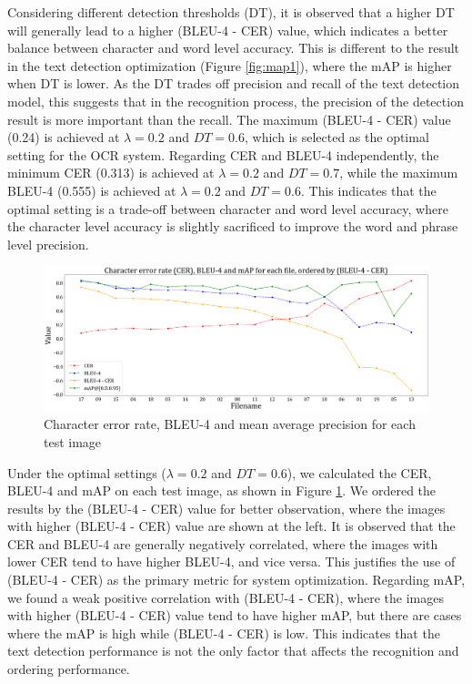 \documentclass[12pt,twoside]{report}
\begin{document}
Considering different detection thresholds (DT), it is observed that a higher DT will generally lead to a higher (BLEU-4 - CER) value, which indicates a better balance between character and word level accuracy. This is different to the result in the text detection optimization (Figure \ref{fig:map1}), where the mAP is higher when DT is lower. As the DT trades off precision and recall of the text detection model, this suggests that in the recognition process, the precision of the detection result is more important than the recall. The maximum (BLEU-4 - CER) value (0.24) is achieved at $\lambda=0.2$ and $DT=0.6$, which is selected as the optimal setting for the OCR system. Regarding CER and BLEU-4 independently, the minimum CER (0.313) is achieved at $\lambda=0.2$ and $DT=0.7$, while the maximum BLEU-4 (0.555) is achieved at $\lambda=0.2$ and $DT=0.6$. This indicates that the optimal setting is a trade-off between character and word level accuracy, where the character level accuracy is slightly sacrificed to improve the word and phrase level precision.

\begin{figure}[htbp]
    \centering
    \includegraphics[width=\textwidth]{./figures/cer_bleu_map.png}
    \caption{Character error rate, BLEU-4 and mean average precision for each test image}
    \label{fig:cer_bleu_map}
\end{figure}

Under the optimal settings ($\lambda=0.2$ and $DT=0.6$), we calculated the CER, BLEU-4 and mAP on each test image, as shown in Figure \ref{fig:cer_bleu_map}. We ordered the results by the (BLEU-4 - CER) value for better observation, where the images with higher (BLEU-4 - CER) value are shown at the left. It is observed that the CER and BLEU-4 are generally negatively correlated, where the images with lower CER tend to have higher BLEU-4, and vice versa. This justifies the use of (BLEU-4 - CER) as the primary metric for system optimization. Regarding mAP, we found a weak positive correlation with (BLEU-4 - CER), where the images with higher (BLEU-4 - CER) value tend to have higher mAP, but there are cases where the mAP is high while (BLEU-4 - CER) is low. This indicates that the text detection performance is not the only factor that affects the recognition and ordering performance.
\end{document}
